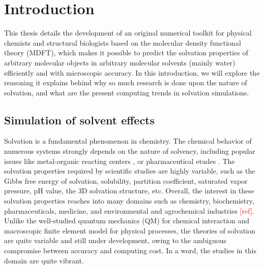 
\chapter{Introduction\label{chpt:introduction}}

This thesis details the development of an original numerical toolkit
for physical chemists and structural biologists based on the molecular
density functional theory (\acs{MDFT}), which makes it possible to
predict the solvation properties of arbitrary molecular objects in
arbitrary molecular solvents (mainly water) efficiently and with microscopic
accuracy. In this introduction, we will explore the reasoning it explains
behind why so much research is done upon the nature of solvation,
and what are the present computing trends in solvation simulations.


\section{Simulation of solvent effects}

Solvation is a fundamental phenomenon in chemistry. The chemical behavior
of numerous systems strongly depends on the nature of solvency, including
popular issues like metal-organic reacting centers \citep{Mn-oxo,PCET},
or pharmaceutical etudes \citep{drug_1_Perlovich,drug_2_Perlovich,drug_3}.
The solvation properties required by scientific studies are highly
variable, such as the Gibbs free energy of solvation, solubility,
partition coefficient, saturated vapor pressure, pH value, the 3D
solvation structure, etc. Overall, the interest in these solvation
properties reaches into many domains such as chemistry, biochemistry,
pharmaceuticals, medicine, and environmental and agrochemical industries
\textcolor{red}{{[}ref{]}}. Unlike the well-studied quantum mechanics
(\acs{QM}) for chemical interaction and macroscopic finite element
model for physical processes, the theories of solvation are quite
variable and still under development, owing to the ambiguous compromise
between accuracy and computing cost. In a word, the studies in this
domain are quite vibrant.

